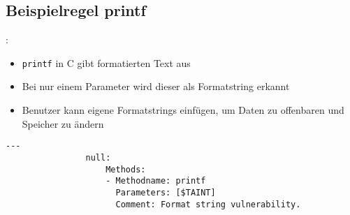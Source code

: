    \subsection{Beispielregel printf}
        \begin{frame}[fragile]{\secname: \subsecname}
            \begin{itemize}
                \item \texttt{printf} in C gibt formatierten Text aus
                \item Bei nur einem Parameter wird dieser als Formatstring erkannt
                \item Benutzer kann eigene Formatstrings einfügen, um Daten zu offenbaren und Speicher zu ändern
            \end{itemize}
            \begin{lstlisting}[gobble=16]
                ---
                null:
                    Methods:
                    - Methodname: printf
                      Parameters: [$TAINT]
                      Comment: Format string vulnerability.
            \end{lstlisting}
        \end{frame}
